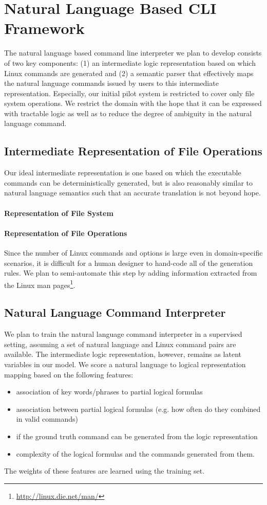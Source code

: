 \section{Natural Language Based CLI Framework}

The natural language based command line interpreter we plan to develop consists of two key components: (1) an intermediate logic representation based on which Linux commands are generated and (2) a semantic parser that effectively maps the natural language commands issued by users to this intermediate representation. Especially, our initial pilot system is restricted to cover only file system operations. We restrict the domain with the hope that it can be expressed with tractable logic as well as to reduce the degree of ambiguity in the natural language command.

\subsection{Intermediate Representation of File Operations}
\label{subsec:represent}
Our ideal intermediate representation is one based on which the executable commands can be deterministically generated, but is also reasonably similar to natural language semantics such that an accurate translation is not beyond hope.
\paragraph{Representation of File System}
\paragraph{Representation of File Operations}
Since the number of Linux commands and options is large even in domain-specific scenarios, it is difficult for a human designer to hand-code all of the generation rules. We plan to semi-automate this step by adding information extracted from the Linux man pages\footnote{\url{http://linux.die.net/man/}}.

\subsection{Natural Language Command Interpreter}
We plan to train the natural language command interpreter in a supervised setting, assuming a set of natural language and Linux command pairs are available. The intermediate logic representation, however, remains as latent variables in our model. We score a natural language to logical representation mapping based on the following features:
\begin{itemize}
	\item association of key words/phrases to partial logical formulas
	\item association between partial logical formulas (e.g. how often do they combined in valid commands)
	\item if the ground truth command can be generated from the logic representation
	\item complexity of the logical formulas and the commands generated from them.
\end{itemize}
The weights of these features are learned using the training set.